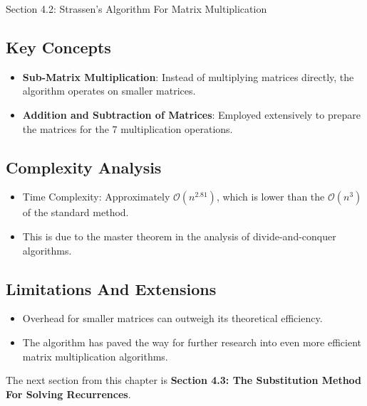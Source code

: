 \begin{notes}{Section 4.2: Strassen's Algorithm For Matrix Multiplication}
    \subsection*{Key Concepts}

    \begin{itemize}
        \item \textbf{Sub-Matrix Multiplication}: Instead of multiplying matrices directly, the algorithm operates on smaller matrices.
        \item \textbf{Addition and Subtraction of Matrices}: Employed extensively to prepare the matrices for the 7 multiplication operations.
    \end{itemize}

    \subsection*{Complexity Analysis}

    \begin{itemize}
        \item Time Complexity: Approximately $\mathcal{O}(n^{2.81})$, which is lower than the $\mathcal{O}(n^{3})$ of the standard method.
        \item This is due to the master theorem in the analysis of divide-and-conquer algorithms.
    \end{itemize}

    \subsection*{Limitations And Extensions}

    \begin{itemize}
        \item Overhead for smaller matrices can outweigh its theoretical efficiency.
        \item The algorithm has paved the way for further research into even more efficient matrix multiplication algorithms.
    \end{itemize}
\end{notes}

The next section from this chapter is \textbf{Section 4.3: The Substitution Method For Solving Recurrences}.

